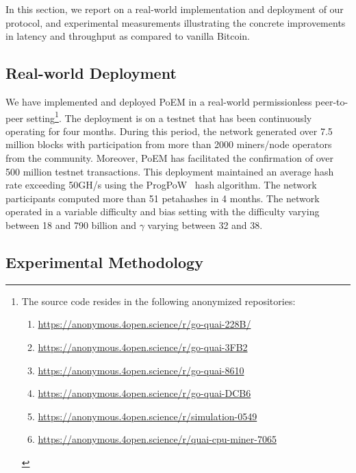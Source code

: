 In this section, we report on a real-world implementation and deployment of our
protocol, and experimental measurements illustrating the concrete improvements
in latency and throughput as compared to vanilla Bitcoin.

\subsection{Real-world Deployment}\label{sec:deployment}

We have implemented and deployed PoEM in a real-world permissionless peer-to-peer
setting\footnote{
    The source code resides in the following anonymized repositories:
    \begin{enumerate}
        \item \url{https://anonymous.4open.science/r/go-quai-228B/}
        \item \url{https://anonymous.4open.science/r/go-quai-3FB2}
        \item \url{https://anonymous.4open.science/r/go-quai-8610}
        \item \url{https://anonymous.4open.science/r/go-quai-DCB6}
        \item \url{https://anonymous.4open.science/r/simulation-0549}
        \item \url{https://anonymous.4open.science/r/quai-cpu-miner-7065}
    \end{enumerate}
}.
The deployment is on a testnet that has been continuously operating for
four months. During this period, the network generated over 7.5 million blocks
with participation from
more than 2000 miners/node operators from the community. Moreover, PoEM has facilitated the
confirmation of over 500 million testnet transactions. This deployment maintained an
average hash rate exceeding 50GH/s using the ProgPoW~\cite{progpow} hash algorithm.
The network participants computed more than 51 petahashes in 4 months.
The network operated in a variable difficulty and bias setting with the difficulty
varying between 18 and 790 billion and $\gamma$ varying between 32 and 38.

\subsection{Experimental Methodology}

